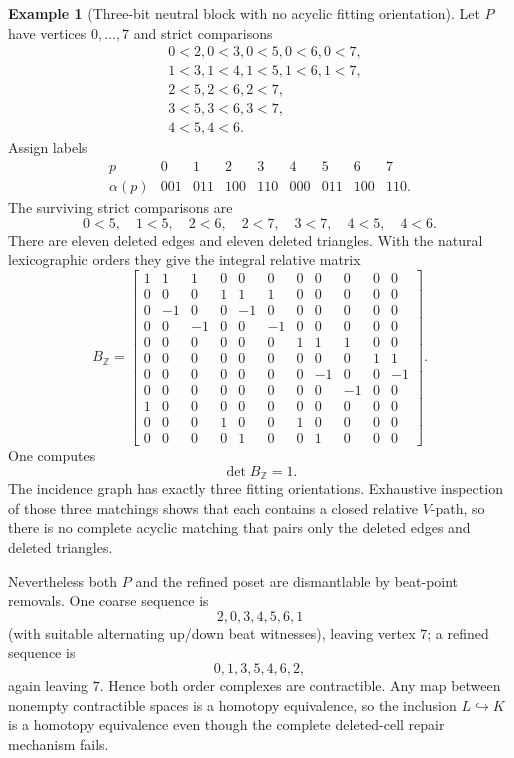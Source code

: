 \documentclass[11pt]{article}
\theoremstyle{definition}
\newtheorem{example}[theorem]{Example}
\begin{document}
\begin{example}[Three-bit neutral block with no acyclic fitting orientation]\label{ex:multi}
Let $P$ have vertices $0,\dots,7$ and strict comparisons
\[
\begin{aligned}
&0<2,0<3,0<5,0<6,0<7,\\
&1<3,1<4,1<5,1<6,1<7,\\
&2<5,2<6,2<7,\\
&3<5,3<6,3<7,\\
&4<5,4<6.
\end{aligned}
\]
Assign labels
\[
\begin{array}{c|cccccccc}
p&0&1&2&3&4&5&6&7\\\hline
\alpha(p)&001&011&100&110&000&011&100&110.
\end{array}
\]
The surviving strict comparisons are
\[
0<5,\quad1<5,\quad2<6,\quad2<7,\quad3<7,\quad4<5,\quad4<6.
\]
There are eleven deleted edges and eleven deleted triangles. With the natural lexicographic orders they give the integral relative matrix
\[
B_{\mathbb Z}=\begin{bmatrix}
1&1&1&0&0&0&0&0&0&0&0\\
0&0&0&1&1&1&0&0&0&0&0\\
0&-1&0&0&-1&0&0&0&0&0&0\\
0&0&-1&0&0&-1&0&0&0&0&0\\
0&0&0&0&0&0&1&1&1&0&0\\
0&0&0&0&0&0&0&0&0&1&1\\
0&0&0&0&0&0&0&-1&0&0&-1\\
0&0&0&0&0&0&0&0&-1&0&0\\
1&0&0&0&0&0&0&0&0&0&0\\
0&0&0&1&0&0&1&0&0&0&0\\
0&0&0&0&1&0&0&1&0&0&0
\end{bmatrix}.
\]
One computes
\[
\det B_{\mathbb Z}=1.
\]
The incidence graph has exactly three fitting orientations. Exhaustive inspection of those three matchings shows that each contains a closed relative $V$-path, so there is no complete acyclic matching that pairs only the deleted edges and deleted triangles.

Nevertheless both $P$ and the refined poset are dismantlable by beat-point removals. One coarse sequence is
\[
2,0,3,4,5,6,1
\]
(with suitable alternating up/down beat witnesses), leaving vertex $7$; a refined sequence is
\[
0,1,3,5,4,6,2,
\]
again leaving $7$. Hence both order complexes are contractible. Any map between nonempty contractible spaces is a homotopy equivalence, so the inclusion $L\hookrightarrow K$ is a homotopy equivalence even though the complete deleted-cell repair mechanism fails.
\end{example}
\end{document}
